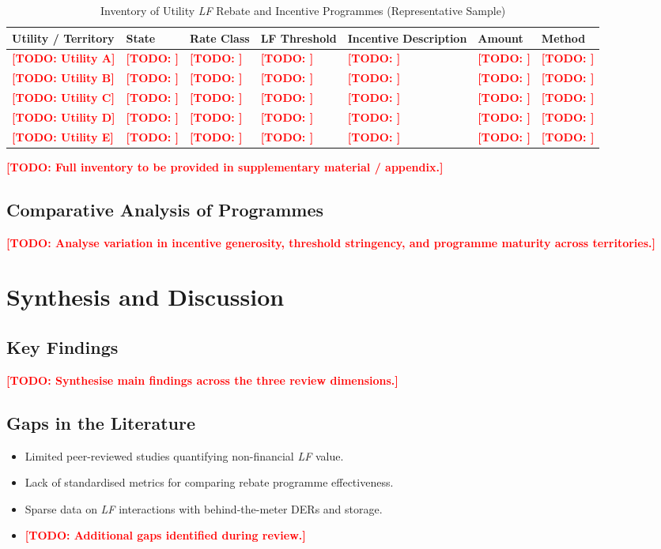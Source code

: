 \documentclass[12pt, a4paper, twocolumn]{article}
\newcommand{\LF}{\textit{LF}}
\newcommand{\TODO}[1]{\textcolor{red}{\textbf{[TODO: #1]}}}
\begin{document}
\begin{table}[ht]
\centering
\caption{Inventory of Utility \LF{} Rebate and Incentive Programmes (Representative Sample)}
\label{tab:inventory}
\small
\begin{tabularx}{\textwidth}{llllXll}
\toprule
\textbf{Utility / Territory} & \textbf{State} & \textbf{Rate Class} & \textbf{LF Threshold} & \textbf{Incentive Description} & \textbf{Amount} & \textbf{Method} \\
\midrule
\TODO{Utility A} & \TODO{} & \TODO{} & \TODO{} & \TODO{} & \TODO{} & \TODO{} \\
\TODO{Utility B} & \TODO{} & \TODO{} & \TODO{} & \TODO{} & \TODO{} & \TODO{} \\
\TODO{Utility C} & \TODO{} & \TODO{} & \TODO{} & \TODO{} & \TODO{} & \TODO{} \\
\TODO{Utility D} & \TODO{} & \TODO{} & \TODO{} & \TODO{} & \TODO{} & \TODO{} \\
\TODO{Utility E} & \TODO{} & \TODO{} & \TODO{} & \TODO{} & \TODO{} & \TODO{} \\
\bottomrule
\end{tabularx}
\end{table}

\TODO{Full inventory to be provided in supplementary material / appendix.}

\subsection{Comparative Analysis of Programmes}
\TODO{Analyse variation in incentive generosity, threshold stringency, and programme maturity across territories.}


\section{Synthesis and Discussion}
\label{sec:discussion}

\subsection{Key Findings}
\TODO{Synthesise main findings across the three review dimensions.}

\subsection{Gaps in the Literature}
\begin{itemize}[nosep]
  \item Limited peer-reviewed studies quantifying non-financial \LF{} value.
  \item Lack of standardised metrics for comparing rebate programme effectiveness.
  \item Sparse data on \LF{} interactions with behind-the-meter DERs and storage.
  \item \TODO{Additional gaps identified during review.}
\end{itemize}
\end{document}
